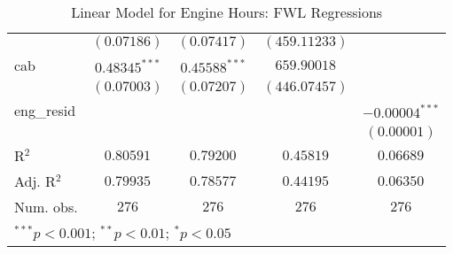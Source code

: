 \begin{table}
\begin{center}
\begin{tabular}{l c c c c}
                    & $(0.07186)$      & $(0.07417)$      & $(459.11233)$     &                  \\
cab                 & $0.48345^{***}$  & $0.45588^{***}$  & $659.90018$       &                  \\
                    & $(0.07003)$      & $(0.07207)$      & $(446.07457)$     &                  \\
eng\_resid          &                  &                  &                   & $-0.00004^{***}$ \\
                    &                  &                  &                   & $(0.00001)$      \\
\hline
R$^2$               & $0.80591$        & $0.79200$        & $0.45819$         & $0.06689$        \\
Adj. R$^2$          & $0.79935$        & $0.78577$        & $0.44195$         & $0.06350$        \\
Num. obs.           & $276$            & $276$            & $276$             & $276$            \\
\hline
\multicolumn{5}{l}{\scriptsize{$^{***}p<0.001$; $^{**}p<0.01$; $^{*}p<0.05$}}
\end{tabular}
\caption{Linear Model for Engine Hours: FWL Regressions}
\label{tab:reg_eng_fwl}
\end{center}
\end{table}
